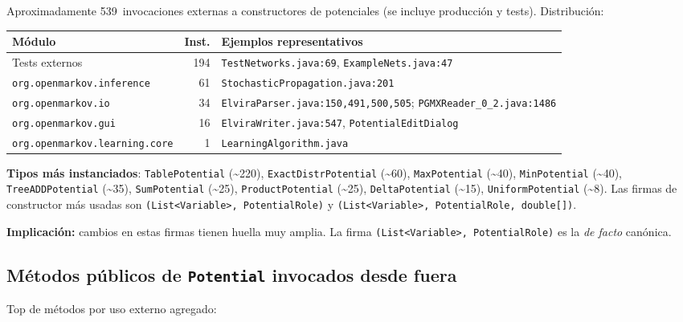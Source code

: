 \documentclass[11pt,a4paper]{article}
\newcommand{\code}[1]{\texttt{#1}}
\newcommand{\warn}[1]{\textcolor{warnorange}{\textbf{#1}}}
\begin{document}
Aproximadamente 539~invocaciones externas a constructores de potenciales (se
incluye producción y tests). Distribución:

\begin{center}
\begin{tabular}{lrl}
\toprule
\textbf{Módulo} & \textbf{Inst.} & \textbf{Ejemplos representativos} \\
\midrule
Tests externos                 & 194 & \code{TestNetworks.java:69}, \code{ExampleNets.java:47} \\
\code{org.openmarkov.inference}     &  61 & \code{StochasticPropagation.java:201} \\
\code{org.openmarkov.io}            &  34 & \code{ElviraParser.java:150,491,500,505}; \code{PGMXReader\_0\_2.java:1486} \\
\code{org.openmarkov.gui}           &  16 & \code{ElviraWriter.java:547}, \code{PotentialEditDialog} \\
\code{org.openmarkov.learning.core} &   1 & \code{LearningAlgorithm.java} \\
\bottomrule
\end{tabular}
\end{center}

\textbf{Tipos más instanciados}: \code{TablePotential} (\textasciitilde 220),
\code{ExactDistrPotential} (\textasciitilde 60), \code{MaxPotential}
(\textasciitilde 40), \code{MinPotential} (\textasciitilde 40),
\code{TreeADDPotential} (\textasciitilde 35), \code{SumPotential}
(\textasciitilde 25), \code{ProductPotential} (\textasciitilde 25),
\code{DeltaPotential} (\textasciitilde 15), \code{UniformPotential}
(\textasciitilde 8). Las firmas de constructor más usadas son
\code{(List<Variable>, PotentialRole)} y \code{(List<Variable>,
PotentialRole, double[])}.

\warn{Implicación:} cambios en estas firmas tienen huella muy amplia. La firma
\code{(List<Variable>, PotentialRole)} es la \emph{de facto} canónica.

\subsection{Métodos públicos de \code{Potential} invocados desde fuera}

Top de métodos por uso externo agregado:
\end{document}
